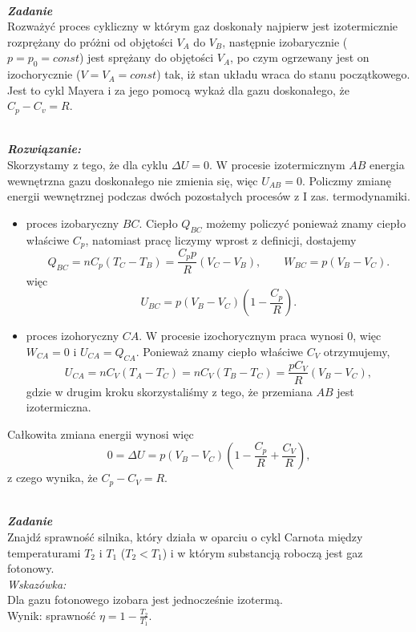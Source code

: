 \documentclass[11pt,a4paper]{article}
\newcounter{zadanie}\newcommand{\zadanie}[1][]{\addtocounter{zadanie}{1} ~\\  {\bf \emph{Zadanie \arabic{zadanie} #1 }} \\}
\newcounter{rozwiazanie}\newcommand{\rozwiazanie}[1][]{\addtocounter{rozwiazanie}{1} ~\\  {\bf \emph{Rozwiązanie: }} \\}
\begin{document}
\newpage

\zadanie
Rozważyć proces cykliczny w którym gaz doskonały najpierw jest izotermicznie rozprężany 
do próżni od objętości $V_A$ do $V_B$, 
następnie izobarycznie ($p=p_0=const$) jest sprężany do objętości $V_A$, 
po czym ogrzewany jest on izochorycznie ($V=V_A=const$) tak, 
iż stan układu wraca do stanu początkowego. 
Jest to cykl Mayera i za jego pomocą wykaż dla gazu doskonałego, że $C_p-C_v=R$.\\

\rozwiazanie
Skorzystamy z tego, że dla cyklu $\Delta U = 0$. W procesie izotermicznym $AB$ energia wewnętrzna gazu doskonałego nie zmienia się, więc $U_{AB} = 0$. Policzmy zmianę energii wewnętrznej podczas dwóch pozostałych procesów z I zas. termodynamiki.
\begin{itemize}
	\item proces izobaryczny $BC$. Ciepło $Q_{BC}$ możemy policzyć ponieważ znamy ciepło właściwe $C_p$, natomiast pracę liczymy wprost z definicji, dostajemy
	\begin{equation}
	Q_{BC} = n C_p (T_C - T_B) = \frac{C_p p }{R}(V_C - V_B), \qquad W_{BC} =  p (V_B - V_C).
	\end{equation}
	więc
	\begin{equation}
		U_{BC} = p (V_B - V_C) \left(1 - \frac{C_p}{R} \right).
	\end{equation}
	\item proces izohoryczny $CA$. W procesie izochorycznym praca wynosi $0$, więc $W_{CA} = 0$ i $U_{CA} = Q_{CA}$. Ponieważ znamy ciepło właściwe $C_V$ otrzymujemy,
	\begin{equation}
		U_{CA} = n C_V (T_A - T_C) = n C_V (T_B - T_C) = \frac{p C_V}{R}(V_B - V_C),
	\end{equation}
	gdzie w drugim kroku skorzystaliśmy z tego, że przemiana $AB$ jest izotermiczna.
\end{itemize}
Całkowita zmiana energii wynosi więc
\begin{equation}
	0 = \Delta U = p (V_B - V_C) \left(1 - \frac{C_p}{R} + \frac{C_V}{R} \right),
\end{equation}
z czego wynika, że $C_p - C_V = R$.

\newpage
\iffalse
\zadanie
Znajdź sprawność silnika, który działa w oparciu o cykl Carnota między temperaturami 
$T_2$ i $T_1$ ($T_2<T_1$) i w którym substancją roboczą jest gaz fotonowy.\\
{\em Wskazówka:}\\
Dla gazu fotonowego izobara jest jednocześnie izotermą. \\
Wynik: sprawność $\eta=1-\frac{T_2}{T_1}$.
\end{document}
